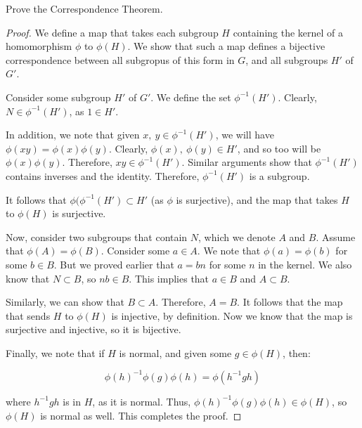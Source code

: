 \documentclass[10pt, oneside]{article}
\newenvironment{problem}[2][Problem]{\begin{trivlist}
\item[\hskip \labelsep {\bfseries #1}\hskip \labelsep {\bfseries #2.}]}{\end{trivlist}}
\begin{document}
    \begin{problem}{7.8}
      Prove the Correspondence Theorem.
    \end{problem}

    \begin{proof}
      We define a map that takes each subgroup $H$ containing the kernel of a homomorphism $\phi$ to $\phi(H)$. We show that such a map defines a bijective correspondence
      between all subgropus of this form in $G$, and all subgroups $H'$ of $G'$.
      \newline

      Consider some subgroup $H'$ of $G'$. We define the set $\phi^{-1}(H')$. Clearly, $N \in \phi^{-1}(H')$, as $1 \in H'$.
      \newline

      In addition, we note that given $x, \ y \in \phi^{-1}(H')$,
      we will have $\phi(xy) = \phi(x) \phi(y)$. Clearly, $\phi(x), \ \phi(y) \in H'$, and so too will be $\phi(x) \phi(y)$. Therefore, $xy \in \phi^{-1}(H')$. Similar arguments show that
      $\phi^{-1}(H')$ contains inverses and the identity. Therefore, $\phi^{-1}(H')$ is a subgroup.
      \newline

      It follows that $\phi(\phi^{-1}(H') \subset H'$ (as $\phi$ is surjective), and the map that takes $H$ to $\phi(H)$ is surjective.
      \newline

      Now, consider two subgroups that contain $N$, which we denote $A$ and $B$. Assume that $\phi(A) = \phi(B)$. Consider some $a \in A$. We note that $\phi(a) = \phi(b)$
      for some $b \in B$. But we proved earlier that $a = bn$ for some $n$ in the kernel. We also know that $N \subset B$, so $nb \in B$. This implies that $a \in B$ and $A \subset B$.
      \newline

      Similarly, we can show that $B \subset A$. Therefore, $A = B$. It follows that the map that sends $H$ to $\phi(H)$ is injective, by definition. Now we know that the map is
      surjective and injective, so it is bijective.
      \newline

      Finally, we note that if $H$ is normal, and given some $g \in \phi(H)$, then:

      $$\phi(h)^{-1} \phi(g) \phi(h) = \phi(h^{-1} g h)$$

      where $h^{-1} g h$ is in $H$, as it is normal. Thus, $\phi(h)^{-1} \phi(g) \phi(h) \in \phi(H)$, so $\phi(H)$ is normal as well. This completes the proof.
    \end{proof}
\end{document}
